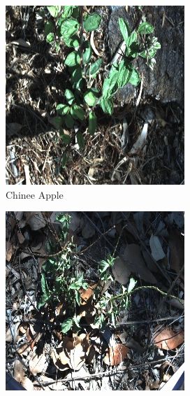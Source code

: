 \begin{figure}[!h]
\centering
    \begin{subfigure}{0.24\textwidth}
        \includegraphics[width=\textwidth]{figuras/problema/chinee_apple.jpg}
        \caption{Chinee Apple}
    \end{subfigure}
    \hfill
    \begin{subfigure}{0.24\textwidth}
        \includegraphics[width=\textwidth]{figuras/problema/snake_weed.jpg}

\end{subfigure}
\end{figure}
